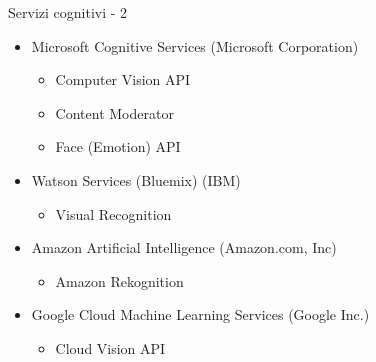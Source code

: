 %
\begin{frame}[t]{Servizi cognitivi - 2}
\begin{itemize}
	\pause
	\item Microsoft Cognitive Services (Microsoft Corporation)
	\begin{itemize}
		\item Computer Vision API
		\item Content Moderator
		\item Face (Emotion) API
	\end{itemize}
	\pause
	\item Watson Services (Bluemix) (IBM)
	\begin{itemize}
		\item Visual Recognition
	\end{itemize}
	\pause
	\item Amazon Artificial Intelligence (Amazon.com, Inc)
	\begin{itemize}
		\item Amazon Rekognition
	\end{itemize}
	\pause
	\item Google Cloud Machine Learning Services (Google Inc.)
	\begin{itemize}
		\item Cloud Vision API
	\end{itemize}
\end{itemize}
\end{frame}
%
